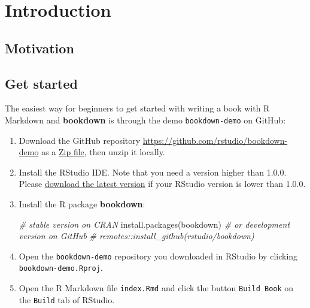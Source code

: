 \documentclass[
]{book}
\newenvironment{Shaded}{\begin{snugshade}}{\end{snugshade}}
\newcommand{\CommentTok}[1]{\textcolor[rgb]{0.56,0.35,0.01}{\textit{#1}}}
\newcommand{\FunctionTok}[1]{\textcolor[rgb]{0.00,0.00,0.00}{#1}}
\newcommand{\NormalTok}[1]{#1}
\newcommand{\StringTok}[1]{\textcolor[rgb]{0.31,0.60,0.02}{#1}}
\begin{document}
\mainmatter

\hypertarget{introduction}{%
\chapter{Introduction}\label{introduction}}

\hypertarget{motivation}{%
\section{Motivation}\label{motivation}}

\hypertarget{get-started}{%
\section{Get started}\label{get-started}}

The easiest way for beginners to get started with writing a book with R Markdown and \textbf{bookdown} is through the demo \texttt{bookdown-demo} on GitHub:

\begin{enumerate}
\def\labelenumi{\arabic{enumi}.}
\item
  Download the GitHub repository \url{https://github.com/rstudio/bookdown-demo} as a \href{https://github.com/rstudio/bookdown-demo/archive/main.zip}{Zip file,} then unzip it locally.
\item
  Install the RStudio IDE. Note that you need a version higher than 1.0.0. Please \href{https://www.rstudio.com/products/rstudio/download/}{download the latest version} if your RStudio version is lower than 1.0.0.
\item
  Install the R package \textbf{bookdown}:

\begin{Shaded}
\begin{Highlighting}[]
\CommentTok{\# stable version on CRAN}
\FunctionTok{install.packages}\NormalTok{(}\StringTok{\textquotesingle{}bookdown\textquotesingle{}}\NormalTok{)}
\CommentTok{\# or development version on GitHub}
\CommentTok{\# remotes::install\_github(\textquotesingle{}rstudio/bookdown\textquotesingle{})}
\end{Highlighting}
\end{Shaded}
\item
  Open the \texttt{bookdown-demo} repository you downloaded in RStudio by clicking \texttt{bookdown-demo.Rproj}.
\item
  Open the R Markdown file \texttt{index.Rmd} and click the button \texttt{Build\ Book} on the \texttt{Build} tab of RStudio.
\end{enumerate}
\end{document}
